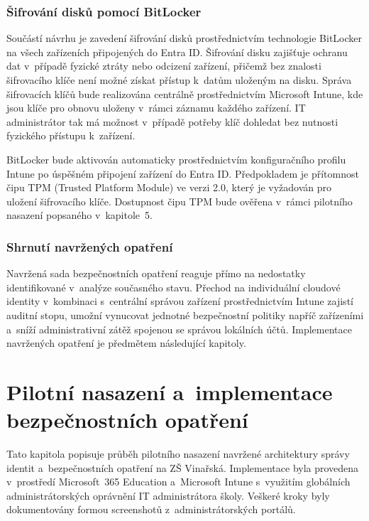 \documentclass[male,czech,api_bc]{kitheses}
\begin{document}
\subsection{Šifrování disků pomocí BitLocker}

Součástí návrhu je zavedení šifrování disků prostřednictvím technologie 
BitLocker na všech zařízeních připojených do Entra ID. Šifrování disku 
zajišťuje ochranu dat v~případě fyzické ztráty nebo odcizení zařízení, 
přičemž bez znalosti šifrovacího klíče není možné získat přístup k~datům 
uloženým na disku. Správa šifrovacích klíčů bude realizována centrálně 
prostřednictvím Microsoft Intune, kde jsou klíče pro obnovu uloženy 
v~rámci záznamu každého zařízení. IT administrátor tak má možnost 
v~případě potřeby klíč dohledat bez nutnosti fyzického přístupu k~zařízení.

BitLocker bude aktivován automaticky prostřednictvím konfiguračního 
profilu Intune po úspěšném připojení zařízení do Entra ID. Předpokladem 
je přítomnost čipu TPM (Trusted Platform Module) ve verzi 2.0, 
který je vyžadován pro uložení šifrovacího klíče. Dostupnost čipu TPM 
bude ověřena v~rámci pilotního nasazení popsaného v~kapitole~5.

\subsection{Shrnutí navržených opatření}

Navržená sada bezpečnostních opatření reaguje přímo na nedostatky 
identifikované v~analýze současného stavu. Přechod na individuální 
cloudové identity v~kombinaci s~centrální správou zařízení prostřednictvím 
Intune zajistí auditní stopu, umožní vynucovat jednotné bezpečnostní 
politiky napříč zařízeními a~sníží administrativní zátěž spojenou 
se správou lokálních účtů. Implementace navržených opatření je 
předmětem následující kapitoly.

\chapter{Pilotní nasazení a~implementace bezpečnostních opatření}

Tato kapitola popisuje průběh pilotního nasazení navržené architektury správy 
identit a~bezpečnostních opatření na ZŠ Vinařská. Implementace byla provedena 
v~prostředí Microsoft~365 Education a~Microsoft Intune s~využitím globálních 
administrátorských oprávnění IT administrátora školy. Veškeré kroky byly 
dokumentovány formou screenshotů z~administrátorských portálů.
\end{document}
